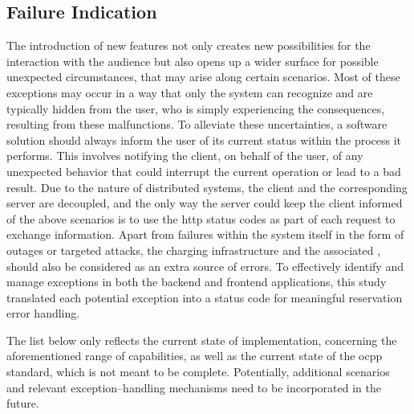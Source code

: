 \newpage

\subsection{Failure Indication}
\label{ch:Implementation:sec:Reservation System:ssec:Failure Indication}

The introduction of new features not only creates new possibilities for the interaction with the audience but also opens up a wider surface for possible unexpected circumstances, that may arise along certain scenarios. 
Most of these exceptions may occur in a way that only the system can recognize and are typically hidden from the user, who is simply experiencing the consequences, resulting from these malfunctions.
To alleviate these uncertainties, a software solution should always inform the user of its current status within the process it performs. This involves notifying the client, on behalf of the user, of any unexpected behavior that could interrupt the current operation or lead to a bad result.
Due to the nature of distributed systems, the client and the corresponding server are decoupled, and the only way the server could keep the client informed of the above scenarios is to use the \acrshort{http} status codes as part of each request to exchange information.
Apart from failures within the system itself in the form of outages or targeted attacks, the charging infrastructure and the associated , should also be considered as an extra source of errors. 
To effectively identify and manage exceptions in both the backend and frontend applications, this study translated each potential exception into a status code for meaningful reservation error handling.

\newpage

\noindent The list below only reflects the current state of implementation, concerning the aforementioned range of capabilities, as well as the current state of the \acrshort{ocpp} standard, which is not meant to be complete. Potentially, additional scenarios and relevant exception--handling mechanisms need to be incorporated in the future.

